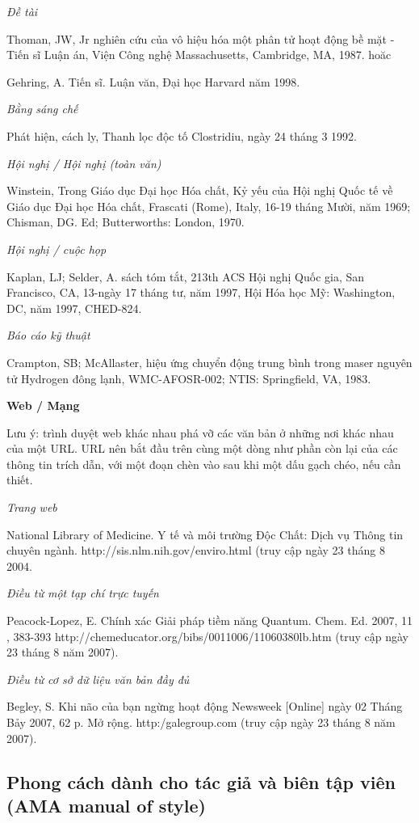 \documentclass{hcmutarticle}
\begin{document}
{\em Đề tài}

Thoman, JW, Jr nghiên cứu của vô hiệu hóa một phân tử hoạt động bề mặt -Tiến sĩ Luận án, Viện Công nghệ Massachusetts, Cambridge, MA, 1987.
hoăc

Gehring, A. Tiến sĩ. Luận văn, Đại học Harvard năm 1998.

{\em Bằng sáng chế}

 Phát hiện, cách ly, Thanh lọc độc tố Clostridiu, ngày 24 tháng 3 1992.

{\em Hội nghị / Hội nghị (toàn văn)}

Winstein, Trong Giáo dục Đại học Hóa chất, Kỷ yếu của Hội nghị Quốc tế về Giáo dục Đại học Hóa chất, Frascati (Rome), Italy, 16-19 tháng Mười, năm 1969; Chisman, DG. Ed; Butterworths: London, 1970.

{\em Hội nghị / cuộc họp }

Kaplan, LJ; Selder, A. sách tóm tắt, 213th ACS Hội nghị Quốc gia, San Francisco, CA, 13-ngày 17 tháng tư, năm 1997, Hội Hóa học Mỹ: Washington, DC, năm 1997, CHED-824.

{\em Báo cáo kỹ thuật }

Crampton, SB; McAllaster, hiệu ứng chuyển động trung bình trong maser nguyên tử Hydrogen đông lạnh, WMC-AFOSR-002; NTIS: Springfield, VA, 1983.

{\bfseries Web / Mạng}

Lưu ý: trình duyệt web khác nhau phá vỡ các văn bản ở những nơi khác nhau của một URL. URL nên bắt đầu trên cùng một dòng như phần còn lại của các thông tin trích dẫn, với một đoạn chèn vào sau khi một dấu gạch chéo, nếu cần thiết.

{\em Trang web}

National Library of Medicine. Y tế và môi trường Độc Chất: Dịch vụ Thông tin chuyên ngành. http://sis.nlm.nih.gov/enviro.html (truy cập ngày 23 tháng 8 2004.

{\em Điều từ một tạp chí trực tuyến}

Peacock-Lopez, E. Chính xác Giải pháp tiềm năng Quantum. Chem. Ed. 2007, 11 , 383-393 http://chemeducator.org/bibs/0011006/11060380lb.htm (truy cập ngày 23 tháng 8 năm 2007).

{\em Điều từ cơ sở dữ liệu văn bản đầy đủ}

Begley, S. Khi não của bạn ngừng hoạt động Newsweek [Online] ngày 02 Tháng Bảy 2007, 62 p. Mở rộng. http:/galegroup.com (truy cập ngày 23 tháng 8 năm 2007).



\subsection{Phong cách dành cho tác giả và biên tập viên (AMA manual of style)}
\end{document}

